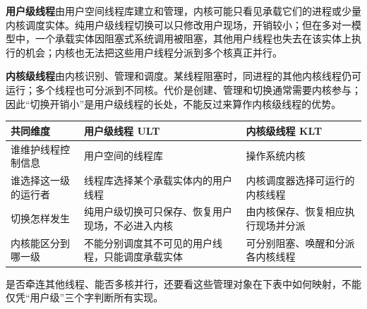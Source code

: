 \textbf{用户级线程}由用户空间线程库建立和管理，内核可能只看见承载它们的进程或少量内核调度实体。纯用户级线程切换可以只修改用户现场，开销较小；但在多对一模型中，一个承载实体因阻塞式系统调用被阻塞，其他用户线程也失去在该实体上执行的机会；内核也无法把这些用户线程分派到多个核真正并行。

\textbf{内核级线程}由内核识别、管理和调度。某线程阻塞时，同进程的其他内核线程仍可运行；多个线程也可分派到不同核。代价是创建、管理和切换通常需要内核参与；因此``切换开销小''是用户级线程的长处，不能反过来算作内核级线程的优势。

\begin{wideblock}

\par\medskip\noindent\begin{minipage}{\linewidth}\fontsize{9.3}{12}\selectfont\begin{tabularx}{\linewidth}{@{}YYY@{}}
\toprule\noalign{}
\begin{minipage}[b]{\linewidth}\raggedright
共同维度
\end{minipage} & \begin{minipage}[b]{\linewidth}\raggedright
用户级线程 ULT
\end{minipage} & \begin{minipage}[b]{\linewidth}\raggedright
内核级线程 KLT
\end{minipage} \\
\midrule\noalign{}


谁维护线程控制信息 & 用户空间的线程库 & 操作系统内核 \\
谁选择这一级的运行者 & 线程库选择某个承载实体内的用户线程 & 内核调度器选择可运行的内核线程 \\
切换怎样发生 & 纯用户级切换可只保存、恢复用户现场，不必进入内核 & 由内核保存、恢复相应执行现场并分派 \\
内核能区分到哪一级 & 不能分别调度其不可见的用户线程，只能调度承载实体 & 可分别阻塞、唤醒和分派各内核线程 \\
\bottomrule\end{tabularx}
\end{minipage}\par\medskip

\end{wideblock}

是否牵连其他线程、能否多核并行，还要看这些管理对象在下表中如何映射，不能仅凭``用户级''三个字判断所有实现。

